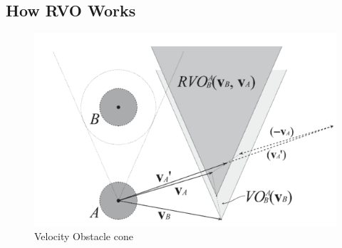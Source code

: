\documentclass[a4paper,twocolumn]{article}
\begin{document}
\subsection{How RVO Works}


\begin{figure}[b]
\includegraphics[scale=0.4]{images/rvoDiagram.png}
\caption{Velocity Obstacle cone}
\label{fig:rvoCone}
\end{figure}
\end{document}
